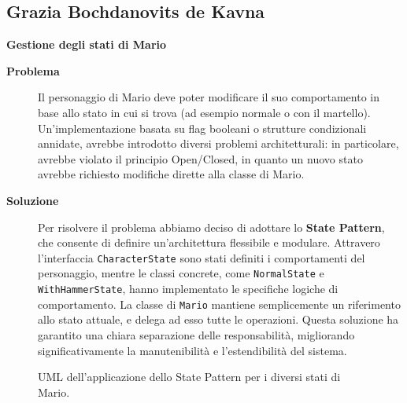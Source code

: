 \documentclass[a4paper,12pt]{report}
\begin{document}
\subsection{Grazia Bochdanovits de Kavna}
\textbf{Gestione degli stati di Mario}
\begin{description}
	\item[\textbf{Problema}]
	      Il personaggio di Mario deve poter modificare il suo comportamento in base allo stato in cui si trova (ad esempio normale o con il martello).
	      Un'implementazione basata su flag booleani o strutture condizionali annidate, avrebbe introdotto diversi problemi architetturali: in particolare,
	      avrebbe violato il principio Open/Closed, in quanto un nuovo stato avrebbe richiesto modifiche dirette alla classe di Mario.

	\item[\textbf{Soluzione}]
	      Per risolvere il problema abbiamo deciso di adottare lo \textbf{State Pattern}, che consente di definire un'architettura flessibile e modulare. Attravero l'interfaccia \texttt{CharacterState} sono stati
	      definiti i comportamenti del personaggio, mentre le classi concrete, come \texttt{NormalState} e \texttt{WithHammerState}, hanno implementato le specifiche logiche di comportamento.
	      La classe di \texttt{Mario} mantiene semplicemente un riferimento allo stato attuale, e delega ad esso tutte le operazioni.
	      Questa soluzione ha garantito una chiara separazione delle responsabilità, migliorando significativamente la manutenibilità e l'estendibilità del sistema.
\end{description}
\begin{figure}[H]
	\centering{}
	
	\caption{UML dell'applicazione dello State Pattern per i diversi stati di Mario.}
	\label{img:MarioState}
\end{figure}
\end{document}
